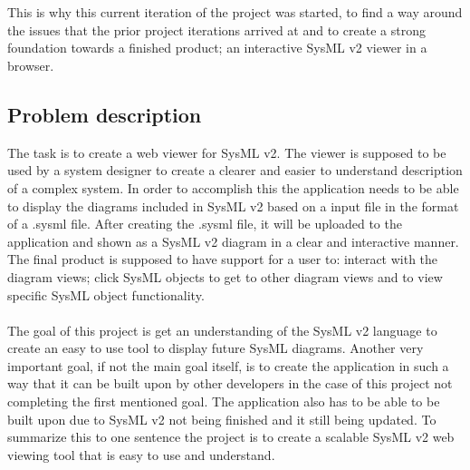 \documentclass{article}
\begin{document}
\\ \\
This is why this current iteration of the project was started, to find a way around the issues that the prior project iterations arrived at and to create a strong foundation towards a finished product; an interactive SysML v2 viewer in a browser.

\subsection{Problem description}
The task is to create a web viewer for SysML v2. The viewer is supposed to be used by a system designer to create a clearer and easier to understand description of a complex system. In order to accomplish this the application needs to be able to display the diagrams included in SysML v2 based on a input file in the format of a .sysml file. After creating the .sysml file, it will be uploaded to the application and shown as a SysML v2 diagram in a clear and interactive manner. The final product is supposed to have support for a user to: interact with the diagram views; click SysML objects to get to other diagram views and to view specific SysML object functionality.
\\\\
The goal of this project is get an understanding of the SysML v2 language to create an easy to use tool to display future SysML diagrams. Another very important goal, if not the main goal itself, is to create the application in such a way that it can be built upon by other developers in the case of this project not completing the first mentioned goal. The application also has to be able to be built upon due to SysML v2 not being finished and it still being updated. To summarize this to one sentence the project is to create a scalable SysML v2 web viewing tool that is easy to use and understand.
\end{document}
